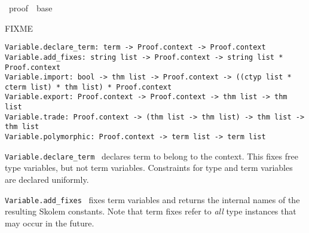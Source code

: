 %
\begin{isabellebody}%
\def\isabellecontext{proof}%
%
\isadelimtheory
\isanewline
\isanewline
\isanewline
%
\endisadelimtheory
%
\isatagtheory
{}\isamarkupfalse%
\ {\isachardoublequoteopen}proof{\isachardoublequoteclose}\ \ base\ %
\endisatagtheory
{\isafoldtheory}%
%
\isadelimtheory
%
\endisadelimtheory
%
\isamarkuptrue%
%
\isamarkuptrue%
%
\isamarkuptrue%
%
\begin{isamarkuptext}%
FIXME%
\end{isamarkuptext}%
\isamarkuptrue%
%
\isadelimmlref
%
\endisadelimmlref
%
\isatagmlref
%
\begin{isamarkuptext}%
\begin{mldecls}
  \verb|Variable.declare_term: term -> Proof.context -> Proof.context| \\
  \verb|Variable.add_fixes: string list -> Proof.context -> string list * Proof.context| \\
  \verb|Variable.import: bool -> thm list -> Proof.context -> ((ctyp list * cterm list) * thm list) * Proof.context| \\
  \verb|Variable.export: Proof.context -> Proof.context -> thm list -> thm list| \\
  \verb|Variable.trade: Proof.context -> (thm list -> thm list) -> thm list -> thm list| \\
  \verb|Variable.polymorphic: Proof.context -> term list -> term list| \\
  \end{mldecls}

  \begin{description}

  \item \verb|Variable.declare_term|~ declares term
   to belong to the context.  This fixes free type
  variables, but not term variables.  Constraints for type and term
  variables are declared uniformly.

  \item \verb|Variable.add_fixes|~ fixes term
  variables  and returns the internal names of the
  resulting Skolem constants.  Note that term fixes refer to
  \emph{all} type instances that may occur in the future.


\end{description}
\end{isamarkuptext}
\end{isabellebody}
